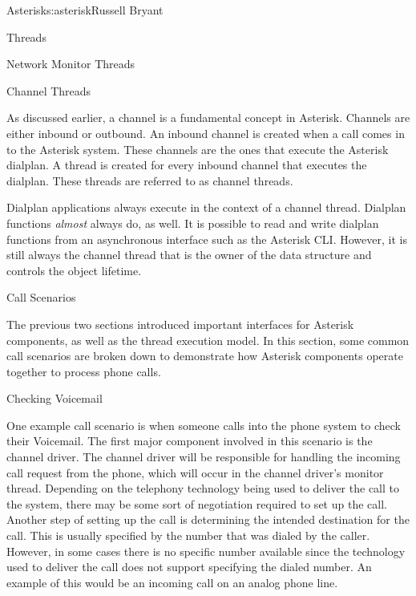 \begin{aosachapter}{Asterisk}{s:asterisk}{Russell Bryant}
\begin{aosasect1}{Threads}
\begin{aosasect2}{Network Monitor Threads}
\end{aosasect2}

\begin{aosasect2}{Channel Threads}

As discussed earlier, a channel is a fundamental concept in
Asterisk. Channels are either inbound or outbound. An inbound channel
is created when a call comes in to the Asterisk system. These channels
are the ones that execute the Asterisk dialplan. A thread is created
for every inbound channel that executes the dialplan. These threads
are referred to as channel threads.

Dialplan applications always execute in the context of a channel
thread. Dialplan functions \emph{almost} always do, as well. It is
possible to read and write dialplan functions from an asynchronous
interface such as the Asterisk CLI\@. However, it is still always the
channel thread that is the owner of the  data
structure and controls the object lifetime.

\end{aosasect2}

\end{aosasect1}

\begin{aosasect1}{Call Scenarios}

The previous two sections introduced important interfaces for Asterisk
components, as well as the thread execution model. In this section,
some common call scenarios are broken down to demonstrate how Asterisk
components operate together to process phone calls.

\begin{aosasect2}{Checking Voicemail}

One example call scenario is when someone calls into the phone system
to check their Voicemail. The first major component involved in this
scenario is the channel driver. The channel driver will be responsible
for handling the incoming call request from the phone, which will
occur in the channel driver's monitor thread. Depending on the
telephony technology being used to deliver the call to the system,
there may be some sort of negotiation required to set up the
call. Another step of setting up the call is determining the intended
destination for the call. This is usually specified by the number that was dialed
by the caller.  However, in some cases there is no specific number
available since the technology used to deliver the call does not
support specifying the dialed number. An example of this would be an
incoming call on an analog phone line.


\end{aosasect2}
\end{aosasect1}
\end{aosachapter}
